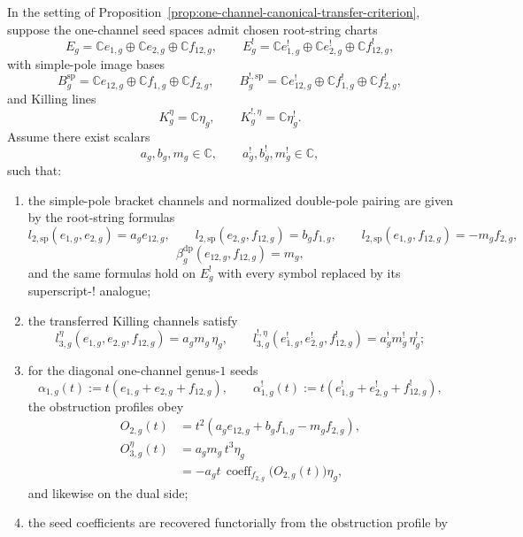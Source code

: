 \begin{proposition}\label{prop:one-channel-transfer-law-criterion}
In the setting of
Proposition~\textup{\ref{prop:one-channel-canonical-transfer-criterion}},
suppose the one-channel seed spaces admit chosen root-string charts
\[
E_g
=
\mathbb{C}e_{1,g}\oplus\mathbb{C}e_{2,g}\oplus\mathbb{C}f_{12,g},
\qquad
E_g^!
=
\mathbb{C}e_{1,g}^!\oplus\mathbb{C}e_{2,g}^!\oplus\mathbb{C}f_{12,g}^!,
\]
with simple-pole image bases
\[
B_g^{\mathrm{sp}}
=
\mathbb{C}e_{12,g}\oplus\mathbb{C}f_{1,g}\oplus\mathbb{C}f_{2,g},
\qquad
B_g^{!,\mathrm{sp}}
=
\mathbb{C}e_{12,g}^!\oplus\mathbb{C}f_{1,g}^!\oplus\mathbb{C}f_{2,g}^!,
\]
and Killing lines
\[
K_g^\eta=\mathbb{C}\eta_g,
\qquad
K_g^{!,\eta}=\mathbb{C}\eta_g^!.
\]
Assume there exist scalars
\[
a_g,b_g,m_g \in \mathbb{C},
\qquad
a_g^!,b_g^!,m_g^! \in \mathbb{C},
\]
such that:
\begin{enumerate}[label=\textup{(\roman*)}]
\item the simple-pole bracket channels and normalized double-pole
  pairing are given by the root-string formulas
  \[
  l_{2,\mathrm{sp}}(e_{1,g},e_{2,g})=a_g e_{12,g},
  \qquad
  l_{2,\mathrm{sp}}(e_{2,g},f_{12,g})=b_g f_{1,g},
  \qquad
  l_{2,\mathrm{sp}}(e_{1,g},f_{12,g})=-m_g f_{2,g},
  \]
  \[
  \beta_g^{\mathrm{dp}}(e_{12,g},f_{12,g})=m_g,
  \]
  and the same formulas hold on $E_g^!$ with every symbol replaced by
  its superscript-$!$ analogue;
\item the transferred Killing channels satisfy
  \[
  l_{3,g}^\eta(e_{1,g},e_{2,g},f_{12,g})=a_gm_g\,\eta_g,
  \qquad
  l_{3,g}^{!,\eta}(e_{1,g}^!,e_{2,g}^!,f_{12,g}^!)=a_g^!m_g^!\,\eta_g^!;
  \]
\item for the diagonal one-channel genus-$1$ seeds
  \[
  \alpha_{1,g}(t):=t(e_{1,g}+e_{2,g}+f_{12,g}),
  \qquad
  \alpha_{1,g}^!(t):=t(e_{1,g}^!+e_{2,g}^!+f_{12,g}^!),
  \]
  the obstruction profiles obey
  \[
  \begin{aligned}
  O_{2,g}(t)
  &=
  t^2(a_g e_{12,g}+b_g f_{1,g}-m_g f_{2,g}), \\
  O_{3,g}^\eta(t)
  &=
  a_gm_g\,t^3\eta_g \\
  &=
  -a_g t\,\operatorname{coeff}_{f_{2,g}}\!\bigl(O_{2,g}(t)\bigr)\eta_g,
  \end{aligned}
  \]
  and likewise on the dual side;
\item the seed coefficients are recovered functorially from the
  obstruction profile by

\end{enumerate}
\end{proposition}
